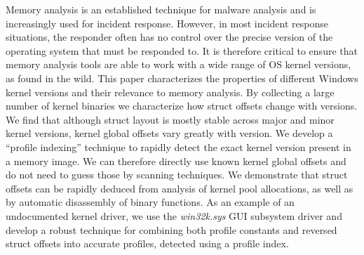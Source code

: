 Memory analysis is an established technique for malware analysis and is
increasingly used for incident response. However, in most incident response
situations, the responder often has no control over the precise version of the
operating system that must be responded to. It is therefore critical to ensure
that memory analysis tools are able to work with a wide range of OS kernel
versions, as found in the wild. This paper characterizes the properties of
different Windows kernel versions and their relevance to memory analysis. By
collecting a large number of kernel binaries we characterize how struct offsets
change with versions. We find that although struct layout is mostly stable
across major and minor kernel versions, kernel global offsets vary greatly with
version. We develop a ``profile indexing'' technique to rapidly detect the exact
kernel version present in a memory image. We can therefore directly use known
kernel global offsets and do not need to guess those by scanning techniques. We
demonstrate that struct offsets can be rapidly deduced from analysis of kernel
pool allocations, as well as by automatic disassembly of binary functions. As an
example of an undocumented kernel driver, we use the {\em win32k.sys} GUI
subsystem driver and develop a robust technique for combining both profile
constants and reversed struct offsets into accurate profiles, detected using a
profile index.
